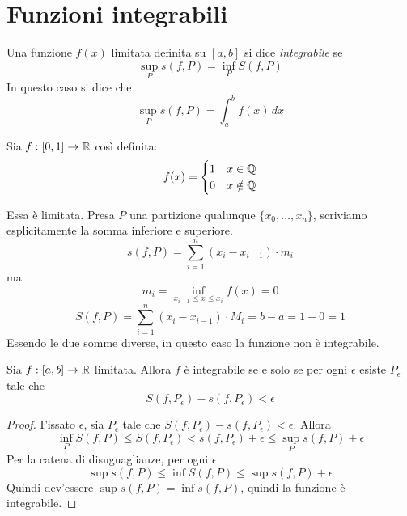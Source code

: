 \section{Funzioni integrabili}
\begin{definition}
Una funzione $f(x)$ limitata definita su $[a,b]$ si dice \emph{integrabile} se
\begin{equation*}
\sup_P s(f,P) = \inf_P S(f,P)
\end{equation*}
In questo caso si dice che
\begin{equation*}
\sup_P s(f,P) = \int_a^b f(x) \, dx
\end{equation*}
\end{definition}

\begin{example}
Sia $f:[0,1] \to \mathbb R$ così definita:
\begin{equation*}
f(x) = \begin{cases}
1 & x \in \mathbb Q \\
0 & x \notin \mathbb Q
\end{cases}
\end{equation*}

Essa è limitata. Presa $P$ una partizione qualunque $\{x_0, \ldots, x_n\}$, scriviamo esplicitamente la somma inferiore e superiore.
\begin{equation*}
s(f,P) = \sum_{i=1}^n (x_i-x_{i-1}) \cdot m_i
\end{equation*}
ma
\begin{equation*}
m_i = \inf_{x_{i-1} \le x \le x_i} f(x) = 0
\end{equation*}
\begin{equation*}
S(f,P) = \sum_{i=1}^n (x_i-x_{i-1}) \cdot M_i = b-a = 1-0 = 1
\end{equation*}
Essendo le due somme diverse, in questo caso la funzione non è integrabile.
\end{example}

\begin{proposition}
Sia $f:[a,b] \to \mathbb R$ limitata. Allora $f$ è integrabile se e solo se per ogni $\epsilon$ esiste $P_\epsilon$ tale che
\begin{equation*}
S(f,P_\epsilon) -s(f,P_\epsilon) < \epsilon
\end{equation*}
\end{proposition}

\begin{proof}
Fissato $\epsilon$, sia $P_\epsilon$ tale che $S(f,P_\epsilon) - s(f,P_\epsilon) < \epsilon$. Allora
\begin{equation*}
\inf_P S(f,P) \le S(f,P_\epsilon) < s(f,P_\epsilon) + \epsilon \le \sup_P s(f,P) + \epsilon
\end{equation*}
Per la catena di disuguaglianze, per ogni $\epsilon$
\begin{equation*}
\sup s(f,P) \le \inf S(f,P) \le \sup s(f,P) + \epsilon
\end{equation*}
Quindi dev'essere $\sup s(f,P) = \inf s(f,P)$, quindi la funzione è integrabile.
\end{proof}

